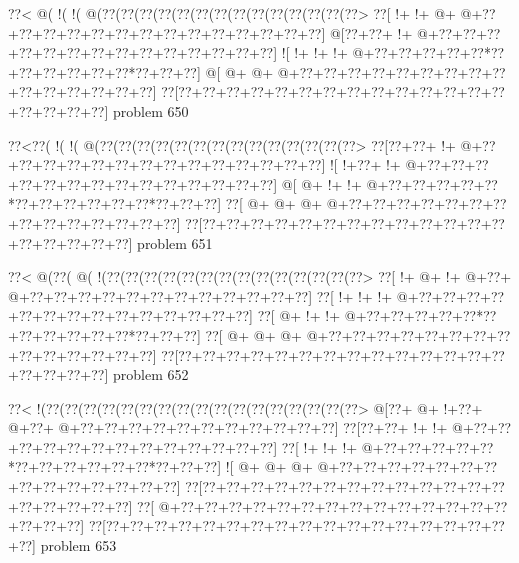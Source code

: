 \vbox{\vbox{\goo
\0??<\- @(\- !(\- !(\- @(\0??(\0??(\0??(\0??(\0??(\0??(\0??(\0??(\0??(\0??(\0??(\0??(\0??(\0??>
\0??[\- !+\- !+\- @+\- @+\0??+\0??+\0??+\0??+\0??+\0??+\0??+\0??+\0??+\0??+\0??+\0??+\0??+\0??]
\- @[\0??+\0??+\- !+\- @+\0??+\0??+\0??+\0??+\0??+\0??+\0??+\0??+\0??+\0??+\0??+\0??+\0??+\0??]
\- ![\- !+\- !+\- !+\- @+\0??+\0??+\0??+\0??+\0??*\0??+\0??+\0??+\0??+\0??+\0??*\0??+\0??+\0??]
\- @[\- @+\- @+\- @+\0??+\0??+\0??+\0??+\0??+\0??+\0??+\0??+\0??+\0??+\0??+\0??+\0??+\0??+\0??]
\0??[\0??+\0??+\0??+\0??+\0??+\0??+\0??+\0??+\0??+\0??+\0??+\0??+\0??+\0??+\0??+\0??+\0??+\0??]
}
\hfil problem 650\hfil\break
}



\vbox{\vbox{\goo
\0??<\0??(\- !(\- !(\- @(\0??(\0??(\0??(\0??(\0??(\0??(\0??(\0??(\0??(\0??(\0??(\0??(\0??(\0??>
\0??[\0??+\0??+\- !+\- @+\0??+\0??+\0??+\0??+\0??+\0??+\0??+\0??+\0??+\0??+\0??+\0??+\0??+\0??]
\- ![\- !+\0??+\- !+\- @+\0??+\0??+\0??+\0??+\0??+\0??+\0??+\0??+\0??+\0??+\0??+\0??+\0??+\0??]
\- @[\- @+\- !+\- !+\- @+\0??+\0??+\0??+\0??+\0??*\0??+\0??+\0??+\0??+\0??+\0??*\0??+\0??+\0??]
\0??[\- @+\- @+\- @+\- @+\0??+\0??+\0??+\0??+\0??+\0??+\0??+\0??+\0??+\0??+\0??+\0??+\0??+\0??]
\0??[\0??+\0??+\0??+\0??+\0??+\0??+\0??+\0??+\0??+\0??+\0??+\0??+\0??+\0??+\0??+\0??+\0??+\0??]
}
\hfil problem 651\hfil\break
}



\vbox{\vbox{\goo
\0??<\- @(\0??(\- @(\- !(\0??(\0??(\0??(\0??(\0??(\0??(\0??(\0??(\0??(\0??(\0??(\0??(\0??(\0??>
\0??[\- !+\- @+\- !+\- @+\0??+\- @+\0??+\0??+\0??+\0??+\0??+\0??+\0??+\0??+\0??+\0??+\0??+\0??]
\0??[\- !+\- !+\- !+\- @+\0??+\0??+\0??+\0??+\0??+\0??+\0??+\0??+\0??+\0??+\0??+\0??+\0??+\0??]
\0??[\- @+\- !+\- !+\- @+\0??+\0??+\0??+\0??+\0??*\0??+\0??+\0??+\0??+\0??+\0??*\0??+\0??+\0??]
\0??[\- @+\- @+\- @+\- @+\0??+\0??+\0??+\0??+\0??+\0??+\0??+\0??+\0??+\0??+\0??+\0??+\0??+\0??]
\0??[\0??+\0??+\0??+\0??+\0??+\0??+\0??+\0??+\0??+\0??+\0??+\0??+\0??+\0??+\0??+\0??+\0??+\0??]
}
\hfil problem 652\hfil\break
}



\vbox{\vbox{\goo
\0??<\- !(\0??(\0??(\0??(\0??(\0??(\0??(\0??(\0??(\0??(\0??(\0??(\0??(\0??(\0??(\0??(\0??(\0??>
\- @[\0??+\- @+\- !+\0??+\- @+\0??+\- @+\0??+\0??+\0??+\0??+\0??+\0??+\0??+\0??+\0??+\0??+\0??]
\0??[\0??+\0??+\- !+\- !+\- @+\0??+\0??+\0??+\0??+\0??+\0??+\0??+\0??+\0??+\0??+\0??+\0??+\0??]
\0??[\- !+\- !+\- !+\- @+\0??+\0??+\0??+\0??+\0??*\0??+\0??+\0??+\0??+\0??+\0??*\0??+\0??+\0??]
\- ![\- @+\- @+\- @+\- @+\0??+\0??+\0??+\0??+\0??+\0??+\0??+\0??+\0??+\0??+\0??+\0??+\0??+\0??]
\0??[\0??+\0??+\0??+\0??+\0??+\0??+\0??+\0??+\0??+\0??+\0??+\0??+\0??+\0??+\0??+\0??+\0??+\0??]
\0??[\- @+\0??+\0??+\0??+\0??+\0??+\0??+\0??+\0??+\0??+\0??+\0??+\0??+\0??+\0??+\0??+\0??+\0??]
\0??[\0??+\0??+\0??+\0??+\0??+\0??+\0??+\0??+\0??+\0??+\0??+\0??+\0??+\0??+\0??+\0??+\0??+\0??]
}
\hfil problem 653\hfil\break
}



